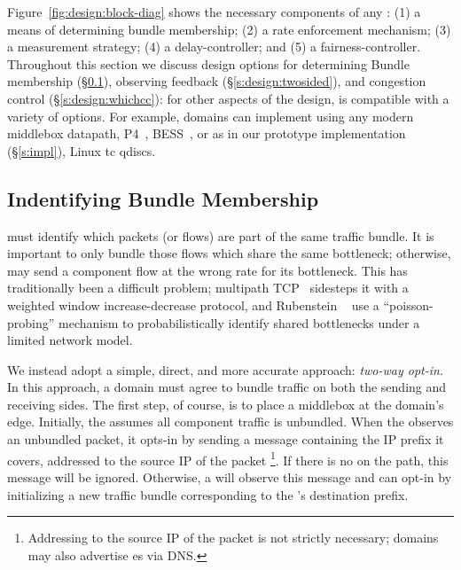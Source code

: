 Figure~\ref{fig:design:block-diag} shows the necessary components of any \name: (1) a means of determining bundle membership; (2) a rate enforcement mechanism; (3) a measurement strategy; (4) a delay-controller; and (5) a fairness-controller.
Throughout this section we discuss design options for determining Bundle membership (\S\ref{s:design:membership}), observing feedback (\S\ref{s:design:twosided}), and congestion control (\S\ref{s:design:whichcc}): for other aspects of the design, \name is compatible with a variety of options. For example, domains can implement \name using any modern middlebox datapath, \eg P4~\cite{p4}, BESS~\cite{bess}, or as in our prototype implementation (\S\ref{s:impl}), Linux tc qdiscs.


\subsection{Indentifying Bundle Membership}\label{s:design:membership}
\name must identify which packets (or flows) are part of the same traffic bundle.
It is important to only bundle those flows which share the same bottleneck; otherwise, \name may send a component flow at the wrong rate for its bottleneck.
This has traditionally been a difficult problem; multipath TCP~\cite{mptcp} sidesteps it with a weighted window increase-decrease protocol, 
and Rubenstein \etal~\cite{active-sharedbottlenecks} use a ``poisson-probing'' mechanism to probabilistically identify shared bottlenecks under a limited network model.

We instead adopt a simple, direct, and more accurate approach: \emph{two-way opt-in}.
In this approach, a domain must agree to bundle traffic on both the sending and receiving sides.
The first step, of course, is to place a \name middlebox at the domain's edge.
Initially, the \inbox assumes all component traffic is unbundled.
When the \outbox observes an unbundled packet, it opts-in by sending a message  containing the IP prefix it covers, addressed to the source IP of the packet
\footnote{Addressing to the source IP of the packet is not strictly necessary; domains may also advertise \inbox{}es via \eg DNS.}.
If there is no \inbox on the path, this message will be ignored.
Otherwise, a \inbox will observe this message and can opt-in by initializing a new traffic bundle corresponding to the \outbox's destination prefix.

